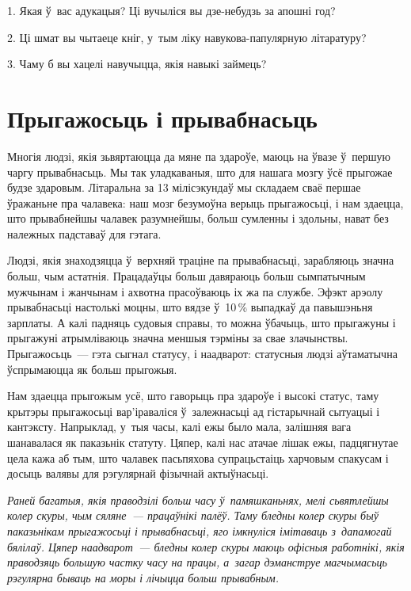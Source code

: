 1. Якая ў~вас адукацыя? Ці вучыліся вы дзе-небудзь за апошні год?

2. Ці шмат вы чытаеце кніг, у~тым ліку навукова-папулярную літаратуру?

3. Чаму б вы хацелі навучыцца, якія навыкі займець?


\section{Прыгажосьць і прывабнасьць}

Многія людзі, якія зьвяртаюцца да мяне па здароўе, маюць на ўвазе ў~першую чаргу прывабнасьць. Мы так уладкаваныя, што для нашага мозгу ўсё прыгожае будзе здаровым. Літаральна за 13 мілісэкундаў мы складаем сваё першае ўражаньне пра чалавека: наш мозг безумоўна верыць прыгажосьці, і нам здаецца, што прывабнейшы чалавек разумнейшы, больш сумленны і здольны, нават без належных падставаў для гэтага. 


Людзі, якія знаходзяцца ў~верхняй траціне па прывабнасьці, зарабляюць значна больш, чым астатнія. Працадаўцы больш давяраюць больш сымпатычным мужчынам і жанчынам і ахвотна прасоўваюць іх жа па службе. Эфэкт арэолу прывабнасьці настолькі моцны, што вядзе ў~10\,\% выпадкаў да павышэньня зарплаты. А калі падняць судовыя справы, то можна ўбачыць, што прыгажуны і прыгажуні атрымліваюць значна меншыя тэрміны за свае злачынствы. Прыгажосьць~--- гэта сыгнал статусу, і наадварот: статусныя людзі аўтаматычна ўспрымаюцца як больш прыгожыя.

Нам здаецца прыгожым усё, што гаворыць пра здароўе і высокі статус, таму крытэры прыгажосьці вар'іраваліся ў~залежнасьці ад гістарычнай сытуацыі і кантэксту. Напрыклад, у~тыя часы, калі ежы было мала, залішняя вага шанавалася як паказьнік статуту. Цяпер, калі нас атачае лішак ежы, падцягнутае цела кажа аб тым, што чалавек пасьпяхова супрацьстаіць харчовым спакусам і досыць валявы для рэгулярнай фізычнай актыўнасьці.

\emph{Раней багатыя, якія праводзілі больш часу ў~памяшканьнях, мелі сьвятлейшы колер скуры, чым сяляне~--- працаўнікі палёў. Таму бледны колер скуры быў паказьнікам прыгажосьці і прывабнасьці, яго імкнуліся імітаваць з~дапамогай бялілаў. Цяпер наадварот~--- бледны колер скуры маюць офісныя работнікі, якія праводзяць большую частку часу на працы, а~загар дэманструе магчымасьць рэгулярна бываць на моры і лічыцца больш прывабным.}

